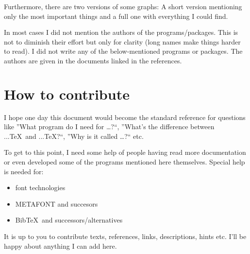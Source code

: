 \documentclass{scrartcl}
\begin{document}
Furthermore, there are two versions of some graphs: A short version mentioning only the most important things and a full one with everything I could find.

In most cases I did not mention the authors of the programs/packages. This is not to diminish their effort but only for clarity (long names make things harder to read). I did not write any of the below-mentioned programs or packages. The authors are given in the documents linked in the references.

\section*{How to contribute}
I hope one day this document would become the standard reference for questions like ”What program do I need for …?“, ”What’s the difference between ...\TeX\ and ...\TeX?“, ”Why is it called …?“ etc.

To get to this point, I need some help of people having read more documentation or even developed some of the programs mentioned here themselves. Special help is needed for:
\begin{itemize}
\item font technologies
\item METAFONT and succesors
\item Bib\TeX\ and successors/alternatives
\end{itemize}

It is up to you to contribute texts, references, links, descriptions, hints etc. I’ll be happy about anything I can add here.

\clearpage
\tableofcontents
\clearpage
\end{document}
